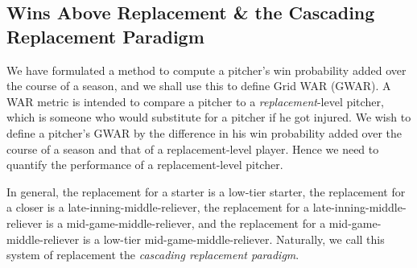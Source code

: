 \documentclass[12pt]{article}
\begin{document}
\subsection{Wins Above Replacement \& the Cascading Replacement Paradigm}

We have formulated a method to compute a pitcher's win probability added over the course of a season, and we shall use this to define Grid WAR (GWAR). A WAR metric is intended to compare a pitcher to a \textit{replacement}-level pitcher, which is someone who would substitute for a pitcher if he got injured. We wish to define a pitcher's GWAR by the difference in his win probability added over the course of a season and that of a replacement-level player. Hence we need to quantify the performance of a replacement-level pitcher.

In general, the replacement for a starter is a low-tier starter, the replacement for a closer is a late-inning-middle-reliever, the replacement for a late-inning-middle-reliever is a mid-game-middle-reliever, and the replacement for a mid-game-middle-reliever is a low-tier mid-game-middle-reliever. Naturally, we call this system of replacement the \textit{cascading replacement paradigm}. 

\end{document}
